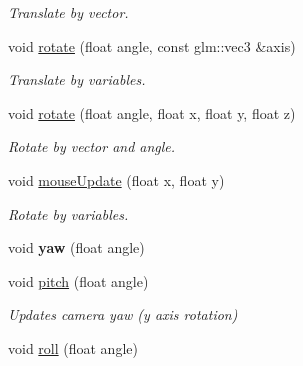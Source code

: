 \begin{DoxyCompactItemize}
\begin{DoxyCompactList}\small\item\em Translate by vector. \end{DoxyCompactList}\item 
\hypertarget{class_camera_a0e6180b5a8da63a999db3de1802c8f4c}{void \hyperlink{class_camera_a0e6180b5a8da63a999db3de1802c8f4c}{rotate} (float angle, const glm\+::vec3 \&axis)}\label{class_camera_a0e6180b5a8da63a999db3de1802c8f4c}

\begin{DoxyCompactList}\small\item\em Translate by variables. \end{DoxyCompactList}\item 
\hypertarget{class_camera_a4a45040f06f24a53af7f17bbcc610f22}{void \hyperlink{class_camera_a4a45040f06f24a53af7f17bbcc610f22}{rotate} (float angle, float x, float y, float z)}\label{class_camera_a4a45040f06f24a53af7f17bbcc610f22}

\begin{DoxyCompactList}\small\item\em Rotate by vector and angle. \end{DoxyCompactList}\item 
void \hyperlink{class_camera_a6d9db1d2cb3323a40be2d6ac1eea1763}{mouse\+Update} (float x, float y)
\begin{DoxyCompactList}\small\item\em Rotate by variables. \end{DoxyCompactList}\item 
\hypertarget{class_camera_ab4eab94754431725c572d528a07a35cc}{void {\bfseries yaw} (float angle)}\label{class_camera_ab4eab94754431725c572d528a07a35cc}

\item 
\hypertarget{class_camera_a49e00b90b94853e4485a6bdf063796de}{void \hyperlink{class_camera_a49e00b90b94853e4485a6bdf063796de}{pitch} (float angle)}\label{class_camera_a49e00b90b94853e4485a6bdf063796de}

\begin{DoxyCompactList}\small\item\em Updates camera yaw (y axis rotation) \end{DoxyCompactList}\item 
\hypertarget{class_camera_a72be99f88b1cc21122178109d3441818}{void \hyperlink{class_camera_a72be99f88b1cc21122178109d3441818}{roll} (float angle)}\label{class_camera_a72be99f88b1cc21122178109d3441818}


\end{DoxyCompactItemize}
